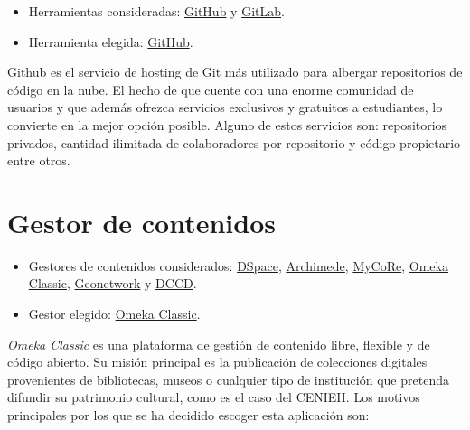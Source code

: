 \documentclass[
]{article}
\providecommand{\tightlist}{%
  \setlength{\itemsep}{0pt}\setlength{\parskip}{0pt}}
\begin{document}
\begin{itemize}
\tightlist
\item
  Herramientas consideradas: \href{https://github.com/}{GitHub} y
  \href{https://gitlab.com/}{GitLab}.
\item
  Herramienta elegida: \href{https://github.com/}{GitHub}.
\end{itemize}

Github es el servicio de {hosting} de Git más utilizado para albergar
repositorios de código en la nube. El hecho de que cuente con una enorme
comunidad de usuarios y que además ofrezca servicios exclusivos y
gratuitos a estudiantes, lo convierte en la mejor opción posible. Alguno
de estos servicios son: repositorios privados, cantidad ilimitada de
colaboradores por repositorio y código propietario entre otros.

\hypertarget{gestor-de-contenidos}{%
\section{Gestor de contenidos}\label{gestor-de-contenidos}}

\begin{itemize}
\tightlist
\item
  Gestores de contenidos considerados:
  \href{https://duraspace.org/dspace/}{DSpace},
  \href{https://www.bibl.ulaval.ca/archimede/index.en.html}{Archimede},
  \href{https://www.mycore.de/}{MyCoRe},
  \href{https://omeka.org/classic/}{Omeka Classic},
  \href{https://github.com/geonetwork/core-geonetwork/}{Geonetwork} y
  \href{https://github.com/DANS-KNAW/dccd-webui}{DCCD}.
\item
  Gestor elegido: \href{https://omeka.org/classic/}{Omeka Classic}.
\end{itemize}

\emph{Omeka Classic} es una plataforma de gestión de contenido libre,
flexible y de código abierto. Su misión principal es la publicación de
colecciones digitales provenientes de bibliotecas, museos o cualquier
tipo de institución que pretenda difundir su patrimonio cultural, como
es el caso del CENIEH. Los motivos principales por los que se ha
decidido escoger esta aplicación son:
\end{document}
